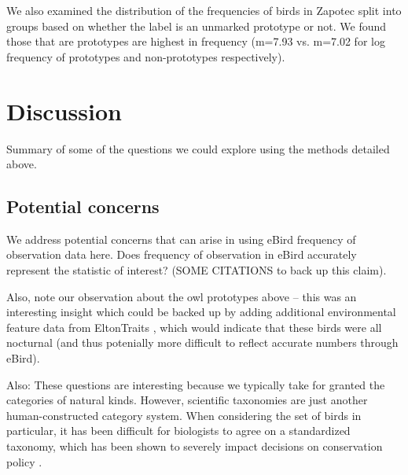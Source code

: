 \documentclass[10pt,letterpaper]{article}
\begin{document}
We also examined the distribution of the frequencies of birds in Zapotec split into groups based on whether the label is an unmarked prototype or not. We found those that are prototypes are highest in frequency (m=7.93 vs. m=7.02 for log frequency of prototypes and non-prototypes respectively).








\section{Discussion}

Summary of some of the questions we could explore using the methods detailed above.

\subsection{Potential concerns}

We address potential concerns that can arise in using eBird frequency of observation data here. Does frequency of observation in eBird accurately represent the statistic of interest? (SOME CITATIONS to back up this claim). 

Also, note our observation about the owl prototypes above -- this was an interesting insight which could be backed up by adding additional environmental feature data from EltonTraits \cite{wilman2014eltontraits}, which would indicate that these birds were all nocturnal (and thus potenially more difficult to reflect accurate numbers through eBird).

Also: These questions are interesting because we typically take for granted the categories of natural kinds. However, scientific taxonomies are just another human-constructed category system. When considering the set of birds in particular, it has been difficult for biologists to agree on a standardized taxonomy, which has been shown to severely impact decisions on conservation policy \cite{peterson2006taxonomy,garnett2017taxonomy}.
\end{document}
